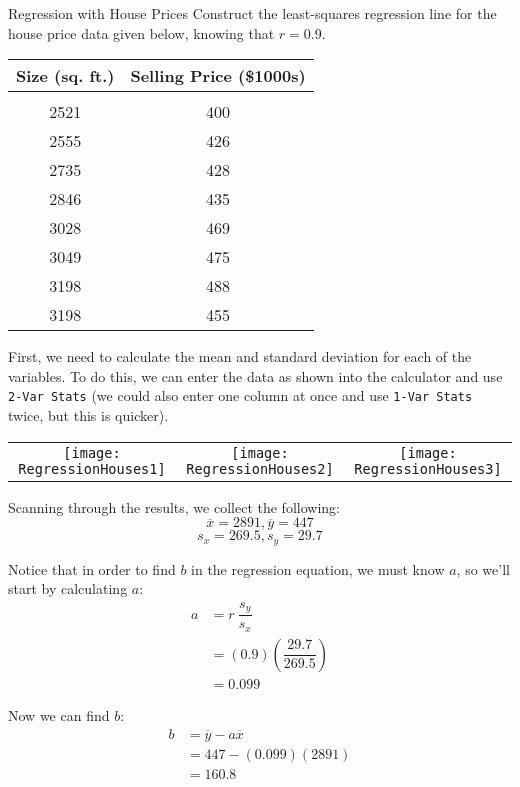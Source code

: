 \begin{example}[https://www.youtube.com/watch?v=hlY2MbHaBfE&list=PLfmpjsIzhzttL_Uec2nCbDRcAcUF7NKG8&index=19]{Regression with House Prices}
Construct the least-squares regression line for the house price data given below, knowing that $r=0.9$.
\begin{center}
\begin{tabular}{c c}
\textbf{Size (sq. ft.)} & \textbf{Selling Price (\$1000s)}\\
\hline
& \\
2521 & 400\\
2555 & 426\\
2735 & 428\\
2846 & 435\\
3028 & 469\\
3049 & 475\\
3198 & 488\\
3198 & 455\\
\end{tabular}
\end{center}

\sol
First, we need to calculate the mean and standard deviation for each of the variables.  To do this, we can enter the data as shown into the calculator and use \texttt{2-Var Stats} (we could also enter one column at once and use \texttt{1-Var Stats} twice, but this is quicker).
\begin{center}
\begin{tabular}{c c c}
\texttt{[image: RegressionHouses1]}
& \texttt{[image: RegressionHouses2]}
& \texttt{[image: RegressionHouses3]}
\end{tabular}
\end{center}
\pagebreak

Scanning through the results, we collect the following:
\[\overline{x} = 2891, \overline{y} = 447\]
\[s_x = 269.5, s_y = 29.7\]

Notice that in order to find $b$ in the regression equation, we must know $a$, so we'll start by calculating $a$:
\begin{align*}
a &= r\ \dfrac{s_y}{s_x}\\
&= (0.9)\left(\dfrac{29.7}{269.5}\right)\\
&= 0.099
\end{align*}

Now we can find $b$:
\begin{align*}
b &= \overline{y} - a\overline{x}\\
&= 447 - (0.099)(2891)\\
&= 160.8
\end{align*}


\end{example}
